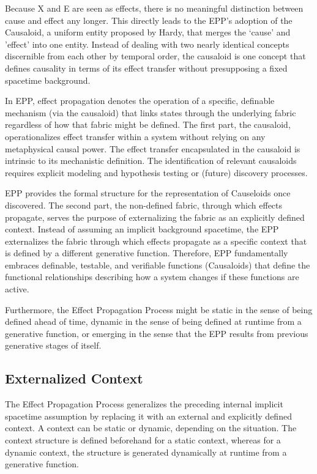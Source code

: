 \documentclass{article}
\begin{document}
Because X and E are seen as effects, there is no meaningful distinction between cause and effect any longer. This directly leads to the EPP’s adoption of the Causaloid, a uniform entity proposed by Hardy\cite{HardyDynamicCausalStructure}, that merges the ‘cause' and 'effect' into one entity. Instead of dealing with two nearly identical concepts discernible from each other by temporal order, the causaloid is one concept that defines causality in terms of its effect transfer without presupposing a fixed spacetime background\cite{HardyDynamicCausalStructure}.

In EPP, effect propagation denotes the operation of a specific, definable mechanism (via the causaloid) that links states through the underlying fabric regardless of how that fabric might be defined. The first part, the causaloid, operationalizes effect transfer within a system without relying on any metaphysical causal power. The effect transfer encapsulated in the causaloid is intrinsic to its mechanistic definition. The identification of relevant causaloids requires explicit modeling and hypothesis testing or (future) discovery processes. 

EPP provides the formal structure for the representation of Causeloids once discovered. The second part, the non-defined fabric, through which effects propagate, serves the purpose of externalizing the fabric as an explicitly defined context. Instead of assuming an implicit background spacetime, the EPP externalizes the fabric through which effects propagate as a specific context that is defined by a different generative function. Therefore, EPP fundamentally embraces definable, testable, and verifiable functions (Causaloids) that define the functional relationships describing how a system changes if these functions are active.

Furthermore, the Effect Propagation Process might be static in the sense of being defined ahead of time, dynamic in the sense of being defined at runtime from a generative function, or emerging in the sense that the EPP results from previous generative stages of itself.

\newpage

\subsection{Externalized Context}
\label{subsec:Externalized_Context}

The Effect Propagation Process generalizes the preceding internal implicit spacetime assumption by replacing it with an external and explicitly defined context.
A context can be static or dynamic, depending on the situation. The context structure is defined beforehand for a static context, whereas for a dynamic context, the structure is generated dynamically at runtime from a generative function.
\end{document}
